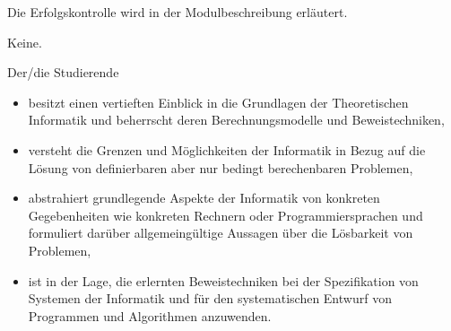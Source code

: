\begin{course}

\setdoclanguagegerman
{}



\coursehead


\label{cour_7481.dp_997}


\begin{styleenv}
\begin{assessment}
Die Erfolgskontrolle wird in der Modulbeschreibung erläutert.


\end{assessment}

\begin{conditions}Keine.\end{conditions}


\end{styleenv}

\begin{learningoutcomes}
Der/die Studierende

 \begin{itemize}\item besitzt einen vertieften Einblick in die Grundlagen der Theoretischen Informatik und beherrscht deren Berechnungsmodelle und Beweistechniken,  \item versteht die Grenzen und Möglichkeiten der Informatik in Bezug auf die Lösung von definierbaren aber nur bedingt berechenbaren Problemen,  \item abstrahiert grundlegende Aspekte der Informatik von konkreten Gegebenheiten wie konkreten Rechnern oder Programmiersprachen und formuliert darüber allgemeingültige Aussagen über die Lösbarkeit von Problemen,  \item ist in der Lage, die erlernten Beweistechniken bei der Spezifikation von Systemen der Informatik und für den systematischen Entwurf von Programmen und Algorithmen anzuwenden.  \end{itemize}
\end{learningoutcomes}


\end{course}
